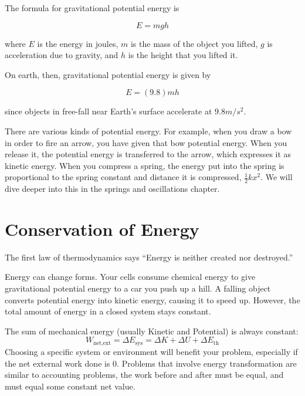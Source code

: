 \begin{mdframed}[style=important, frametitle={Formula for Gravitational Potential Energy}]
The formula for gravitational potential energy is

\[
E = mgh
\]

where $E$ is the energy in joules, $m$ is the mass of the object you
lifted, $g$ is acceleration due to gravity, and $h$ is the height that you lifted it.

On earth, then, gravitational potential energy is given by

\[
E = (9.8)mh
\]

since objects in free-fall near Earth's surface accelerate at $9.8 m/s^2$.

\end{mdframed}


There are various kinds of potential energy. For example, when you draw a bow in 
order to fire an arrow, you have given that bow potential energy. When you release it, the potential energy is transferred to the arrow, which expresses it as kinetic energy. When you compress a spring, the energy put into the spring is proportional to the spring constant and distance it is compressed, $\frac{1}{2} kx^2$. We will dive deeper into this in the springs and oscillations chapter.


\section{Conservation of Energy}

The first law of thermodynamics says ``Energy is neither created nor destroyed.''

Energy can change forms. Your cells consume chemical energy to give gravitational potential energy to a car you push up a hill. A falling object converts potential energy into kinetic energy, causing it to speed up. However, the total amount of energy in a closed system stays constant. 

The sum of mechanical energy (usually Kinetic and Potential) is always constant:
\[
W_\text{net,ext}=\Delta E_\text{sys}=\Delta K+\Delta U+\Delta E_\text{th}
\]
Choosing a specific system or environment will benefit your problem, especially if the net external work done is $0$. Problems that involve energy transformation are similar to accounting problems, the work before and after must be equal, and must equal some constant net value.

